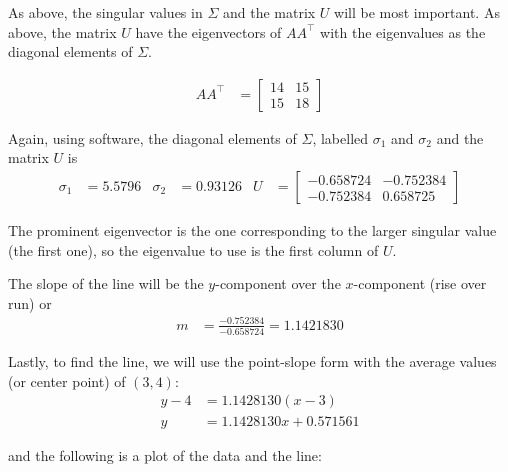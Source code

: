 As above, the singular values in $\Sigma$ and the matrix $U$ will be most important.  As above, the matrix $U$ have the eigenvectors of $AA^{\intercal}$ with the eigenvalues as the diagonal elements of $\Sigma$.  

\begin{align*}
AA^{\intercal} & = \begin{bmatrix}
14 & 15 \\ 15 & 18 
\end{bmatrix}
\end{align*}

Again, using software, the diagonal elements of $\Sigma$, labelled $\sigma_1$ and $\sigma_2$ and the matrix $U$ is 
\begin{align*}
\sigma_1 & = 5.5796 & \sigma_2 & = 0.93126 & U & = \begin{bmatrix}
-0.658724 & -0.752384 \\
-0.752384 & 0.658725
\end{bmatrix}
\end{align*}

The prominent eigenvector is the one corresponding to the larger singular value (the first one), so the eigenvalue to use is the first column of $U$.  

The slope of the line will be the $y$-component over the $x$-component (rise over run) or
\begin{align*}
m & = \frac{-0.752384}{-0.658724} = 1.1421830
\end{align*}

Lastly, to find the line, we will use the point-slope form with the average values (or center point) of $(3,4)$:
\begin{align*}
y-4 & = 1.1428130 (x-3) \\
y & = 1.1428130 x + 0.571561
\end{align*}

and the following is a plot of the data and the line:

\begin{center}
\end{center}

